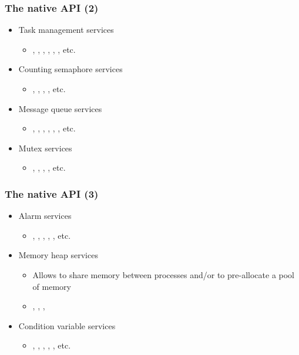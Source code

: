 \begin{frame}
  \frametitle{The native API (2)}
  \begin{itemize}
  \item Task management services
    \begin{itemize}
    \item {}, ,
      , ,
      , , etc.
    \end{itemize}
  \item Counting semaphore services
    \begin{itemize}
    \item {}, ,
      , , etc.
    \end{itemize}
  \item Message queue services
    \begin{itemize}
    \item {}, ,
      , ,
      , , etc.
    \end{itemize}
  \item Mutex services
    \begin{itemize}
    \item {}, ,
      , , etc.
    \end{itemize}
  \end{itemize}
\end{frame}

\begin{frame}
  \frametitle{The native API (3)}
  \begin{itemize}
  \item Alarm services
    \begin{itemize}
    \item {}, ,
      , ,
      , etc.
    \end{itemize}
  \item Memory heap services
    \begin{itemize}
    \item Allows to share memory between processes and/or to
      pre-allocate a pool of memory
    \item {}, ,
      , 
    \end{itemize}
  \item Condition variable services
    \begin{itemize}
    \item {}, ,
      , ,
      , etc.
    \end{itemize}
  \end{itemize}
\end{frame}

